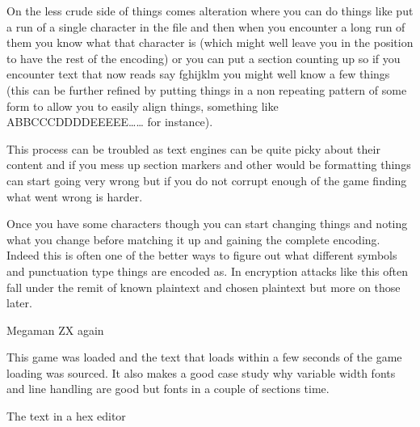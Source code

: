 \documentclass[
]{book}
\begin{document}
On the less crude side of things comes alteration where you can do things like put a run of a single character in the file and then when you encounter a long run of them you know what that character is (which might well leave you in the position to have the rest of the encoding) or you can put a section counting up so if you encounter text that now reads say fghijklm you might well know a few things (this can be further refined by putting things in a non repeating pattern of some form to allow you to easily align things, something like ABBCCCDDDDEEEEE\ldots\ldots{} for instance).

This process can be troubled as text engines can be quite picky about their content and if you mess up section markers and other would be formatting things can start going very wrong but if you do not corrupt enough of the game finding what went wrong is harder.

Once you have some characters though you can start changing things and noting what you change before matching it up and gaining the complete encoding. Indeed this is often one of the better ways to figure out what different symbols and punctuation type things are encoded as. In encryption attacks like this often fall under the remit of known plaintext and chosen plaintext but more on those later.

Megaman ZX again

This game was loaded and the text that loads within a few seconds of the game loading was sourced. It also makes a good case study why variable width fonts and line handling are good but fonts in a couple of sections time.

The text in a hex editor
\end{document}
